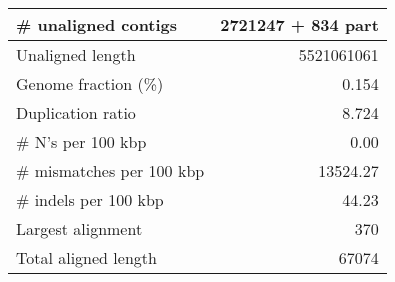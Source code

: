 \documentclass[12pt,a4paper]{article}
\begin{document}
\begin{table}[ht]
\begin{center}
\begin{tabular}{|l*{1}{|r}|}
\# unaligned contigs & 2721247 + 834 part \\ \hline
Unaligned length & 5521061061 \\ \hline
Genome fraction (\%) & 0.154 \\ \hline
Duplication ratio & 8.724 \\ \hline
\# N's per 100 kbp & 0.00 \\ \hline
\# mismatches per 100 kbp & 13524.27 \\ \hline
\# indels per 100 kbp & 44.23 \\ \hline
Largest alignment & 370 \\ \hline
Total aligned length & 67074 \\ \hline
\end{tabular}
\end{center}
\end{table}
\end{document}
